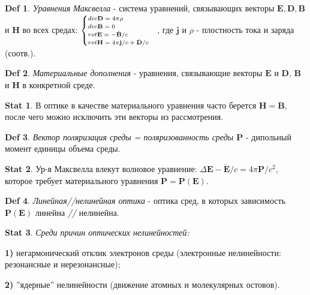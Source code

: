 \documentclass[a4paper,12pt]{article}
\theoremstyle{definition} %
\newtheorem{Stat}{Stat}[section]
\theoremstyle{definition} %
\newtheorem{Def}{Def}[section]
\theoremstyle{remark} %
\begin{document}
\begin{Def}\label{def \theDef}
	\textit{Уравнения Максвелла} - система уравнений, связывающих векторы $\mathbf{E}, \mathbf{D}, \mathbf{B}$ и $\mathbf{H}$  во всех средах: $\scriptsize
	\begin{cases}
		div \mathbf{D} = 4 \pi \rho \\
		div \mathbf{B} = 0 \\
		rot \mathbf{E} = -\dot{\mathbf{B}}/c \\
		rot \mathbf{H} = 4\pi \mathbf{j}/c + \dot{\mathbf{D}}/c
	\end{cases}$, где $\mathbf{j}$ и $\rho$ - плостность тока и заряда (соотв.).
\end{Def}
\begin{Def}\label{def \theDef}
	\textit{Материальные дополнения} - уравнения, связывающие векторы $\mathbf{E}$ и $\mathbf{D}$, $\mathbf{B}$ и $\mathbf{H}$ в конкретной среде.
\end{Def}
\begin{Stat}\label{stat \theStat}
	В оптике в качестве материального уравнения часто берется $\mathbf{H}=\mathbf{B}$, после чего можно исключить эти векторы из рассмотрения.
\end{Stat}
\begin{Def}\label{def \theDef}
	\textit{Вектор поляризация среды = поляризованность среды $\mathbf{P}$} - дипольный момент единицы объема среды.
\end{Def}
\begin{Stat}\label{stat \theStat}
	Ур-я Максвелла влекут волновое уравнение: $\Delta \mathbf{E}-\ddot{\mathbf{E}}/c=4\pi \mathbf{P}/c^{2}$, которое требует материального уравнения $\mathbf{P} = \mathbf{P}(\mathbf{E})$.
\end{Stat}
\begin{Def}\label{def \theDef}
	\textit{Линейная//нелинейная оптика} - оптика сред, в которых зависимость $\mathbf{P}(\mathbf{E})$ линейна \textit{//} нелинейна.
\end{Def}
\begin{Stat}\label{stat \theStat}
	\textit{Среди причин оптических нелинейностей:} \\
	\par \textbf{1)} негармонический отклик электронов среды (электронные нелинейности: резонансные и нерезонансные); \\
	\par \textbf{2)} ''ядерные'' нелинейности (движение атомных и молекулярных остовов).
\end{Stat}
\end{document}
